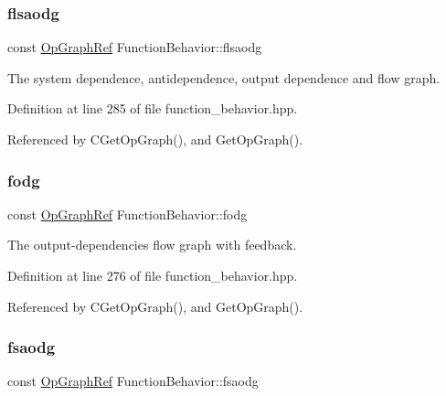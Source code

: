 \subsubsection{\texorpdfstring{flsaodg}{flsaodg}}
{\footnotesize\ttfamily const \hyperlink{op__graph_8hpp_aee97c95c40f791b60c451d9e29c72d39}{Op\+Graph\+Ref} Function\+Behavior\+::flsaodg\hspace{0.3cm}{\ttfamily [private]}}



The system dependence, antidependence, output dependence and flow graph. 



Definition at line 285 of file function\+\_\+behavior.\+hpp.



Referenced by C\+Get\+Op\+Graph(), and Get\+Op\+Graph().

\mbox{\label{classFunctionBehavior_a4fed02a22fd4d284b2241560af004bf0}} 
\subsubsection{\texorpdfstring{fodg}{fodg}}
{\footnotesize\ttfamily const \hyperlink{op__graph_8hpp_aee97c95c40f791b60c451d9e29c72d39}{Op\+Graph\+Ref} Function\+Behavior\+::fodg\hspace{0.3cm}{\ttfamily [private]}}



The output-\/dependencies flow graph with feedback. 



Definition at line 276 of file function\+\_\+behavior.\+hpp.



Referenced by C\+Get\+Op\+Graph(), and Get\+Op\+Graph().

\mbox{\label{classFunctionBehavior_a9a8446266ad8efcd206f51bed66584ca}} 
\subsubsection{\texorpdfstring{fsaodg}{fsaodg}}
{\footnotesize\ttfamily const \hyperlink{op__graph_8hpp_aee97c95c40f791b60c451d9e29c72d39}{Op\+Graph\+Ref} Function\+Behavior\+::fsaodg\hspace{0.3cm}{\ttfamily [private]}}



